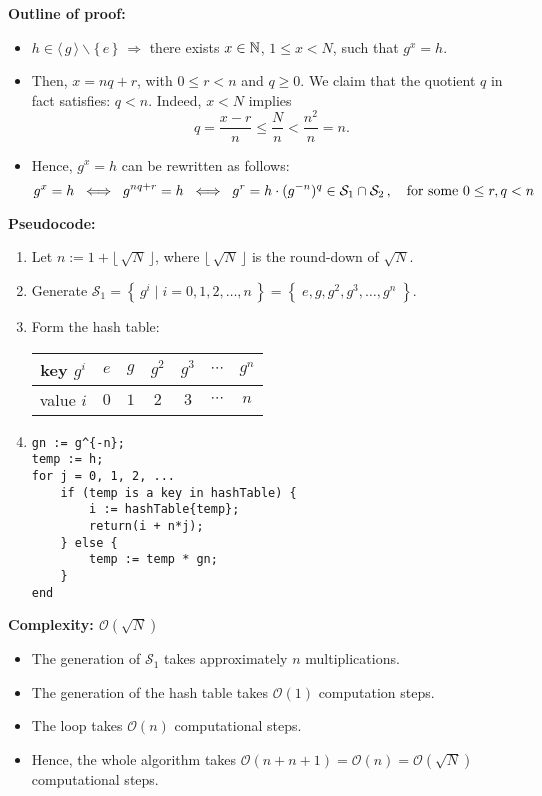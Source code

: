 \noindent
\textbf{Outline of proof:}
\begin{itemize}
\item	$h \in \langle\,g\,\rangle \backslash \{\,e\,\}$ $\Longrightarrow$ there exists $x \in \mathbb{N}$, $1 \leq x < N$, such that $g^{x} = h$.
\item 	Then, $x = nq + r$, with $0 \leq r < n$ and $q \geq 0$. We claim that the quotient $q$ in fact satisfies: $q < n$.
		Indeed, $x < N$ implies
		\begin{equation*}
		q = \dfrac{x - r}{n} \leq \dfrac{N}{n} < \dfrac{n^{2}}{n} = n.
		\end{equation*}
\item	Hence, $g^{x} = h$ can be rewritten as follows:
		\begin{equation*}
		g^{x} = h
		\;\;\Longleftrightarrow\;\; g^{nq+r} = h
		\;\;\Longleftrightarrow\;\; g^{r} = h\cdot(g^{-n})^{q} \in \mathcal{S}_{1}\cap\mathcal{S}_{2}\,,
		\quad
		\textnormal{for some $0\leq r,q < n$}
		\end{equation*}
\end{itemize}

\noindent
\textbf{Pseudocode:}
\begin{enumerate}
\item	Let $n := 1 + \lfloor\,\sqrt{N}\,\rfloor$, where $\lfloor\,\sqrt{N}\,\rfloor$ is the round-down of $\sqrt{N}$.
\item	Generate $\mathcal{S}_{1} = \left\{\,g^{i}\;\vert\;i = 0,1,2,\ldots,n\,\right\}=\left\{\;e, g, g^{2}, g^{3}, \ldots, g^{n}\;\right\}$.
\item	Form the hash table:
		\begin{center}
		\begin{tabular}{|c||c|c|c|c|c|c|}
		\hline
		key $g^{i}$ & $e$ & $g$ & $g^{2}$ & $g^{3}$ & $\cdots$ & $g^{n}$ \\
		\hline
		value $i$    & $0$ & $1$ & $2$ & $3$ & $\cdots$ & $n$ \\
		\hline
		\end{tabular}
		\end{center}
\item	\begin{verbatim}
gn := g^{-n};
temp := h;
for j = 0, 1, 2, ...
    if (temp is a key in hashTable) {
        i := hashTable{temp};
        return(i + n*j);
    } else {
        temp := temp * gn;
    }
end
		\end{verbatim}
\end{enumerate}

\noindent
\textbf{Complexity: $\mathcal{O}(\sqrt{N})$}
\begin{itemize}
\item	The generation of $\mathcal{S}_{1}$ takes approximately $n$ multiplications.
\item	The generation of the hash table takes $\mathcal{O}(1)$ computation steps.
\item	The loop takes $\mathcal{O}(n)$ computational steps.
\item	Hence, the whole algorithm takes $\mathcal{O}(n+n+1) = \mathcal{O}(n) = \mathcal{O}(\sqrt{N})$ computational steps.
\end{itemize}

